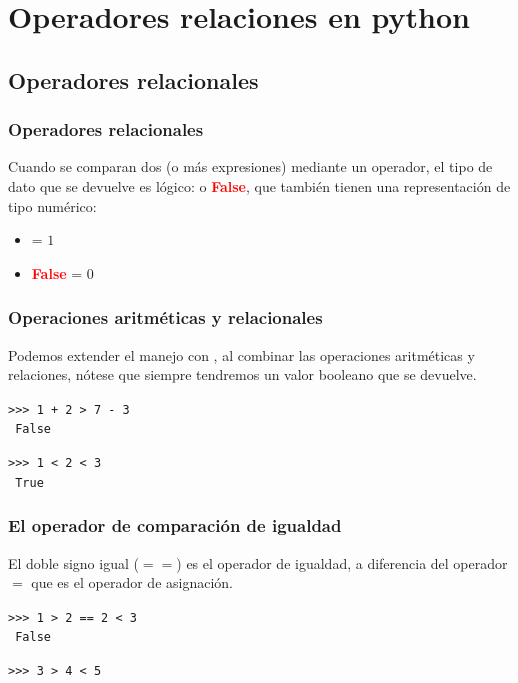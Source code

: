 {\section{Operadores relaciones en python}
\subsection{Operadores relacionales}
\begin{frame}
\frametitle{Operadores relacionales}
Cuando se comparan dos (o más expresiones) mediante un operador, el tipo de dato que se devuelve es lógico:  o \textcolor{red}{\textbf{False}}, que también tienen una representación de tipo numérico:
\begin{itemize}
\item {} = $1$
\item \textcolor{red}{\textbf{False}} = $0$
\end{itemize}
\end{frame}
\begin{frame}[fragile]
\frametitle{Operaciones aritméticas y relacionales}
Podemos extender el manejo con \python, al combinar las operaciones aritméticas y relaciones, nótese que siempre tendremos un valor booleano que se devuelve.
\begin{block}{}
\verb|>>> 1 + 2 > 7 - 3| \\
\pause
\verb| False|
\end{block}
\end{frame}
\begin{frame}[fragile]
\begin{block}{}
\verb|>>> 1 < 2 < 3| \\
\pause
\verb| True|
\end{block}
\end{frame}
\begin{frame}[fragile]
\frametitle{El operador de comparación de igualdad}
El doble signo igual ($==$) es el operador de igualdad, a diferencia del operador $=$ que es el operador de asignación.
\begin{block}{}
\verb|>>> 1 > 2 == 2 < 3| \\
\pause
\verb| False|
\end{block}
\end{frame}
\begin{frame}[fragile]
\begin{block}{}
\verb|>>> 3 > 4 < 5| \\
\pause

\end{block}
\end{frame}}
